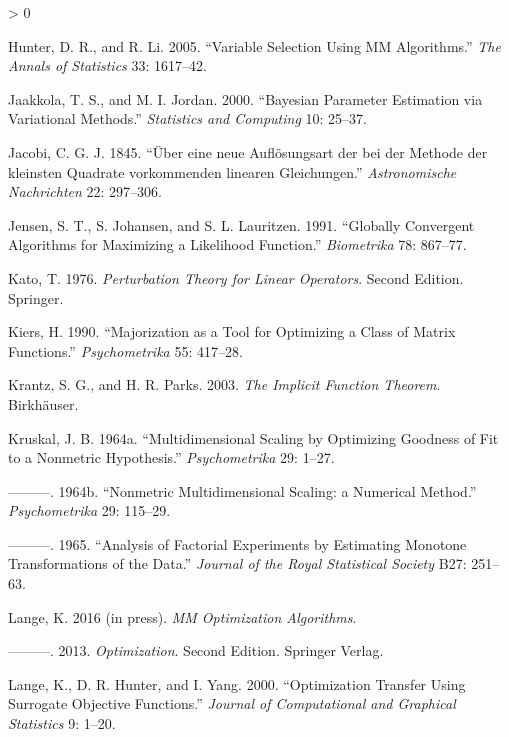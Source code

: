 \documentclass[
  12pt,
]{book}
\newlength{\cslhangindent}
\newenvironment{CSLReferences}[2] %
 {%
  \setlength{\parindent}{0pt}
  \ifodd #1 \everypar{\setlength{\hangindent}{\cslhangindent}}\ignorespaces\fi
  \ifnum #2 > 0
  \setlength{\parskip}{#2\baselineskip}
  \fi
 }%
 {}
\begin{document}
\begin{CSLReferences}{1}{0}
\leavevmode\hypertarget{ref-hunter_li_05}{}%
Hunter, D. R., and R. Li. 2005. {``{Variable Selection Using MM Algorithms}.''} \emph{The Annals of Statistics} 33: 1617--42.

\leavevmode\hypertarget{ref-jaakkola_jordan_00}{}%
Jaakkola, T. S., and M. I. Jordan. 2000. {``{Bayesian Parameter Estimation via Variational Methods}.''} \emph{Statistics and Computing} 10: 25--37.

\leavevmode\hypertarget{ref-jacobi_45}{}%
Jacobi, C. G. J. 1845. {``{{Ü}ber eine neue Aufl{ö}sungsart der bei der Methode der kleinsten Quadrate vorkommenden linearen Gleichungen}.''} \emph{Astronomische Nachrichten} 22: 297--306.

\leavevmode\hypertarget{ref-jensen_johansen_lauritzen_91}{}%
Jensen, S. T., S. Johansen, and S. L. Lauritzen. 1991. {``{Globally Convergent Algorithms for Maximizing a Likelihood Function}.''} \emph{Biometrika} 78: 867--77.

\leavevmode\hypertarget{ref-kato_76}{}%
Kato, T. 1976. \emph{Perturbation Theory for Linear Operators}. Second Edition. Springer.

\leavevmode\hypertarget{ref-kiers_90}{}%
Kiers, H. 1990. {``{Majorization as a Tool for Optimizing a Class of Matrix Functions}.''} \emph{Psychometrika} 55: 417--28.

\leavevmode\hypertarget{ref-krantz_parks_03}{}%
Krantz, S. G., and H. R. Parks. 2003. \emph{The Implicit Function Theorem}. Birkh{ä}user.

\leavevmode\hypertarget{ref-kruskal_64a}{}%
Kruskal, J. B. 1964a. {``{Multidimensional Scaling by Optimizing Goodness of Fit to a Nonmetric Hypothesis}.''} \emph{Psychometrika} 29: 1--27.

\leavevmode\hypertarget{ref-kruskal_64b}{}%
---------. 1964b. {``{Nonmetric Multidimensional Scaling: a Numerical Method}.''} \emph{Psychometrika} 29: 115--29.

\leavevmode\hypertarget{ref-kruskal_65}{}%
---------. 1965. {``{Analysis of Factorial Experiments by Estimating Monotone Transformations of the Data}.''} \emph{Journal of the Royal Statistical Society} B27: 251--63.

\leavevmode\hypertarget{ref-lange_16}{}%
Lange, K. 2016 (in press). \emph{MM Optimization Algorithms}.

\leavevmode\hypertarget{ref-lange_13}{}%
---------. 2013. \emph{Optimization}. Second Edition. Springer Verlag.

\leavevmode\hypertarget{ref-lange_hunter_yang_00}{}%
Lange, K., D. R. Hunter, and I. Yang. 2000. {``{Optimization Transfer Using Surrogate Objective Functions}.''} \emph{Journal of Computational and Graphical Statistics} 9: 1--20.


\end{CSLReferences}
\end{document}
